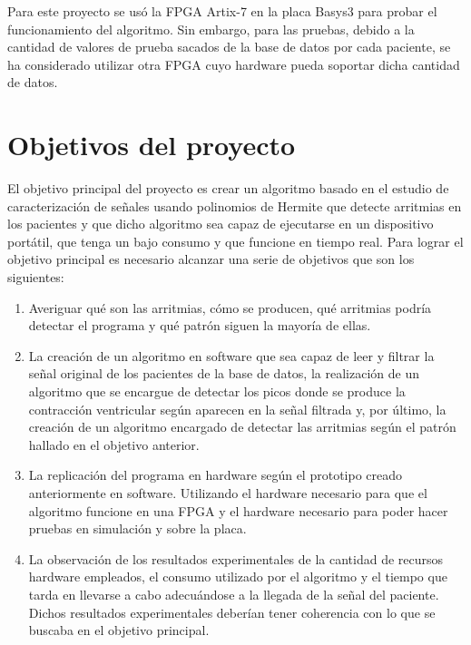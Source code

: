 Para este proyecto se usó la FPGA Artix-7 en la placa Basys3 para probar el funcionamiento del algoritmo. Sin embargo, para las pruebas, debido a la cantidad de valores de prueba sacados de la base de datos por cada paciente, se ha considerado utilizar otra FPGA cuyo hardware pueda soportar dicha cantidad de datos.


\section{Objetivos del proyecto}

El objetivo principal del proyecto es crear un algoritmo basado en el estudio de caracterización de señales usando polinomios de Hermite \cite{desai2021low} que detecte arritmias en los pacientes y que dicho algoritmo sea capaz de ejecutarse en un dispositivo portátil, que tenga un bajo consumo y que funcione en tiempo real. Para lograr el objetivo principal es necesario alcanzar una serie de objetivos que son los siguientes:

\begin{enumerate}
    \item Averiguar qué son las arritmias, cómo se producen, qué arritmias podría detectar el programa y qué patrón siguen la mayoría de ellas.
    \item La creación de un algoritmo en software que sea capaz de leer y filtrar la señal original de los pacientes de la base de datos, la realización de un algoritmo que se encargue de detectar los picos donde se produce la contracción ventricular según aparecen en la señal filtrada y, por último, la creación de un algoritmo encargado de detectar las arritmias según el patrón hallado en el objetivo anterior.
    \item La replicación del programa en hardware según el prototipo creado anteriormente en software. Utilizando el hardware necesario para que el algoritmo funcione en una FPGA y el hardware necesario para poder hacer pruebas en simulación y sobre la placa.
    \item La observación de los resultados experimentales de la cantidad de recursos hardware empleados, el consumo utilizado por el algoritmo y el tiempo que tarda en llevarse a cabo adecuándose a la llegada de la señal del paciente. Dichos resultados experimentales deberían tener coherencia con lo que se buscaba en el objetivo principal.
\end{enumerate}


